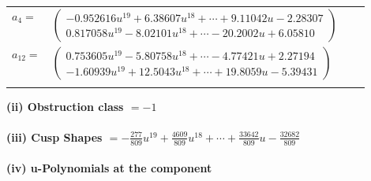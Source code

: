 \documentclass[1p]{elsarticle_modified}
\theoremstyle{definition}
\begin{document}
\begin{tabular}{m{7pt} m{180pt} m{7pt} m{180pt} }
\flushright $a_{4}=$&$\begin{pmatrix}-0.952616 u^{19}+6.38607 u^{18}+\cdots+9.11042 u-2.28307\\0.817058 u^{19}-8.02101 u^{18}+\cdots-20.2002 u+6.05810\end{pmatrix}$ \\
\flushright $a_{12}=$&$\begin{pmatrix}0.753605 u^{19}-5.80758 u^{18}+\cdots-4.77421 u+2.27194\\-1.60939 u^{19}+12.5043 u^{18}+\cdots+19.8059 u-5.39431\end{pmatrix}$\\&\end{tabular}
\flushleft \textbf{(ii) Obstruction class $= -1$}\\~\\
\flushleft \textbf{(iii) Cusp Shapes $= -\frac{277}{809} u^{19}+\frac{4609}{809} u^{18}+\cdots+\frac{33642}{809} u-\frac{32682}{809}$}\\~\\
\newpage\renewcommand{\arraystretch}{1}
\flushleft \textbf{(iv) u-Polynomials at the component}\newline \\
\end{document}
